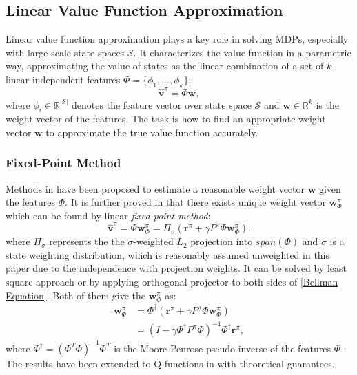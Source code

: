 \documentclass[onecolumn, conference]{IEEEtran}
\begin{document}
\subsection{Linear Value Function Approximation}\label{subsec: LVFA}
 Linear value function approximation plays a key role in solving MDPs, especially with large-scale state spaces $\mathcal{S}$. It characterizes the value function in a parametric way, approximating the value of states as the linear combination of a set of $k$ linear independent features $\Phi = \{\phi_1,..., \phi_k\}$:
 	\begin{equation}
 		\hat{\boldsymbol{v}}^{\pi} =  \Phi \boldsymbol{w},
 	\end{equation}
 	where $\phi_i \in \mathbb{R}^{|\mathcal{S}|}$ denotes the feature vector over state space $\mathcal{S}$ and $\boldsymbol{w} \in \mathbb{R}^k$ is the weight vector of the features. The task is how to find an appropriate weight vector $\boldsymbol{w}$ to approximate the true value function accurately.
 	
\subsubsection{Fixed-Point Method} Methods in \cite{Bradtke2004LinearLA, Sutton2005LearningTP, Geramifard2006IncrementalLT} have been proposed to estimate a reasonable weight vector $\boldsymbol{w}$ given the features $\Phi$. It is further proved in \cite{Koller1999ComputingFV} that there exists unique weight vector $\boldsymbol{w}^\pi_\Phi$ which can be found by linear \textit{fixed-point method}:
	\begin{equation}\label{fixed-point method}
		\hat{\boldsymbol{v}}^{\pi} = \Phi \boldsymbol{w}_\Phi^\pi  = \Pi_\sigma (\boldsymbol{r}^\pi + \gamma P^\pi \Phi \boldsymbol{w}_\Phi^\pi ).
	\end{equation}
	where $\Pi_\sigma$ represents the the $\sigma$-weighted $L_2$ projection into $span(\Phi)$ and $\sigma$ is a state weighting distribution, which is reasonably assumed unweighted in this paper due to the independence with projection weights. It can be solved by least square approach or by applying orthogonal projector to both sides of \eqref{Bellman Equation}. Both of them give the $\boldsymbol{w}^\pi_\Phi$ as:
	\begin{equation}\label{fixed-point solution}
		\begin{split}
		\boldsymbol{w}_\Phi^\pi &= \Phi^{\dagger} (\boldsymbol{r}^\pi + \gamma P^\pi \Phi \boldsymbol{w}_\Phi^\pi )\\
		&= (I-\gamma \Phi^{\dagger} P^\pi \Phi )^{-1}\Phi^{\dagger}\boldsymbol{r}^\pi,
		\end{split}
	\end{equation}
	where $\Phi^{\dagger} = (\Phi^T\Phi)^{-1}\Phi^T$ is the Moore-Penrose pseudo-inverse of the features $\Phi$ \cite{EtAl2007MatrixC3}. The results have been extended to Q-functions in \cite{Song2016LinearFE} with theoretical guarantees.
\end{document}

